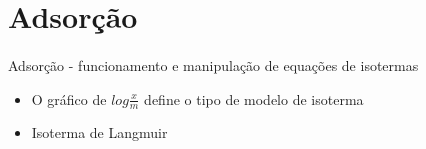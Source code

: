 
\section{Adsorção}

\paragraph{ } Adsorção - funcionamento e manipulação de equações de isotermas

\begin{itemize}
  \item O gráfico de $log \frac{x}{m}$ define o tipo de modelo de isoterma 
  \item Isoterma de Langmuir 
\end{itemize}
